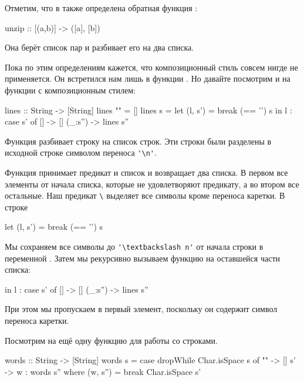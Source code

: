 Отметим, что в  также определена обратная функция :

\begin{code}
unzip   :: [(a,b)] -> ([a], [b]) 
\end{code}

Она берёт список пар и разбивает его на два списка.

Пока по этим определениям кажется, что композиционный стиль 
совсем нигде не применяется. Он встретился нам лишь в функции
. Но давайте посмотрим и на функции
с композиционным стилем:

\begin{code}
lines            :: String -> [String]
lines ""         =  []
lines s          =  let (l, s') = break (== '\n') s
                    in  l : case s' of
                              []      -> []
                              (_:s'') -> lines s''
\end{code}

Функция  разбивает строку на список строк. 
Эти строки были разделены в исходной строке 
символом переноса \verb!'\n'!. 

Функция  принимает предикат и список 
и возвращает два списка. В первом все элементы от начала
списка, которые не удовлетворяют предикату, а во втором все остальные.
Наш предикат \verb!\! выделяет все символы 
кроме переноса каретки. В строке 

\begin{code}
let (l, s') = break (== '\n') s
\end{code}

Мы сохраняем все символы до \verb!'\textbackslash n'! от начала
строки в переменной . Затем мы рекурсивно вызываем
функцию  на оставшейся части списка:

\begin{code}
                    in  l : case s' of
                              []      -> []
                              (_:s'') -> lines s''
\end{code}

При этом мы пропускаем в  первый элемент, поскольку
он содержит символ переноса каретки. 

Посмотрим на ещё одну функцию для работы со строками. 

\begin{code}
words            :: String -> [String]
words s          =  case dropWhile Char.isSpace s of
                      "" -> []
                      s' -> w : words s''
                            where (w, s'') = break Char.isSpace s'
\end{code}


